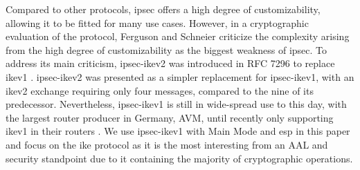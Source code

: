 Compared to other protocols, \ac{ipsec} offers a high degree of customizability, allowing it to be fitted for many use cases. However, in a cryptographic evaluation of the protocol, Ferguson and Schneier \cite{ferguson1999cryptographic} criticize the complexity arising from the high degree of customizability as the biggest weakness of \ac{ipsec}. To address its main criticism, \ac{ipsec}-\ac{ike}v2 was introduced in RFC 7296 to replace \ac{ike}v1 \cite{rfc:ikev2}. \ac{ipsec}-\ac{ike}v2 was presented as a simpler replacement for \ac{ipsec}-\ac{ike}v1, with an \ac{ike}v2 exchange requiring only four messages, compared to the nine of its predecessor. Nevertheless, \ac{ipsec}-\ac{ike}v1 is still in wide-spread use to this day, with the largest router producer in Germany, AVM, until recently only supporting \ac{ike}v1 in their routers \cite{avm2022}. We use \ac{ipsec}-\ac{ike}v1 with Main Mode and \ac{esp} in this paper and focus on the \ac{ike} protocol as it is the most interesting from an AAL and security standpoint due to it containing the majority of cryptographic operations.
\cleardoublepage
